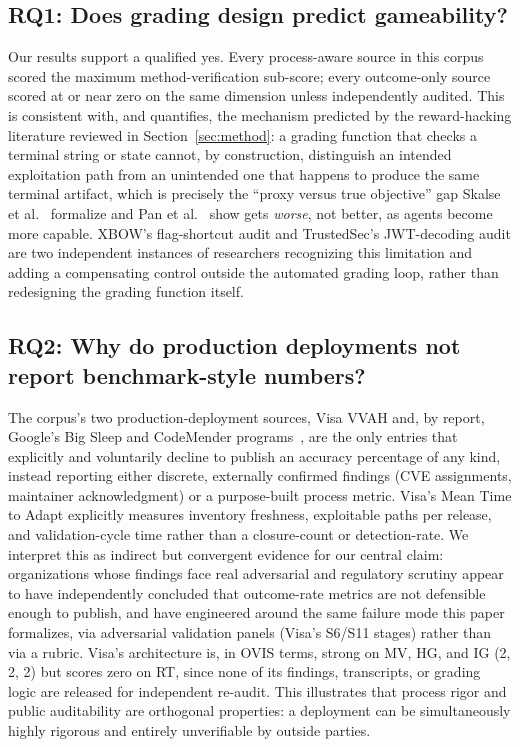 \documentclass[10pt,twocolumn]{article}
\begin{document}
\subsection{RQ1: Does grading design predict gameability?}
Our results support a qualified yes. Every process-aware source in this
corpus scored the maximum method-verification sub-score; every
outcome-only source scored at or near zero on the same dimension unless
independently audited. This is consistent with, and quantifies, the
mechanism predicted by the reward-hacking literature reviewed in
Section~\ref{sec:method}: a grading function that checks a terminal
string or state cannot, by construction, distinguish an intended
exploitation path from an unintended one that happens to produce the
same terminal artifact, which is precisely the ``proxy versus true
objective'' gap Skalse et al.~\cite{skalse2022reward} formalize and Pan
et al.~\cite{pan2022reward} show gets \emph{worse}, not better, as
agents become more capable. XBOW's flag-shortcut audit and TrustedSec's
JWT-decoding audit are two independent instances of researchers
recognizing this limitation and adding a compensating control outside
the automated grading loop, rather than redesigning the grading function
itself.

\subsection{RQ2: Why do production deployments not report benchmark-style numbers?}
The corpus's two production-deployment sources, Visa VVAH and, by
report, Google's Big Sleep and CodeMender
programs~\cite{bigsleep2025}, are the only entries that explicitly and
voluntarily decline to publish an accuracy percentage of any kind,
instead reporting either discrete, externally confirmed findings (CVE
assignments, maintainer acknowledgment) or a purpose-built process
metric. Visa's Mean Time to Adapt explicitly measures inventory
freshness, exploitable paths per release, and validation-cycle time
rather than a closure-count or detection-rate. We interpret this as
indirect but convergent evidence for our central claim: organizations
whose findings face real adversarial and regulatory scrutiny appear to
have independently concluded that outcome-rate metrics are not
defensible enough to publish, and have engineered around the same
failure mode this paper formalizes, via adversarial validation panels
(Visa's S6/S11 stages) rather than via a rubric. Visa's architecture is,
in OVIS terms, strong on MV, HG, and IG (2, 2, 2) but scores zero on RT,
since none of its findings, transcripts, or grading logic are released
for independent re-audit. This illustrates that process rigor and
public auditability are orthogonal properties: a deployment can be
simultaneously highly rigorous and entirely unverifiable by outside
parties.
\end{document}
